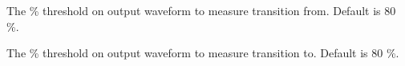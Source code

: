 \documentclass[12pt, a4paper]{article}
\begin{document}


The \% threshold on output waveform to measure transition from. Default is 80 \%.



The \% threshold on output waveform to measure transition to. Default is 80 \%.
\end{document}
